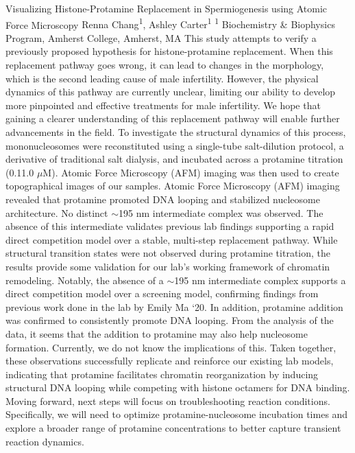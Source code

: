 \makeabstract
    {
    Visualizing Histone-Protamine Replacement in Spermiogenesis using Atomic Force Microscopy
    }
    {
    Renna Chang\textsuperscript{1}, Ashley Carter\textsuperscript{1}
    }
    {
    \textsuperscript{1} Biochemistry \& Biophysics Program, Amherst College, Amherst, MA
    }
    {
    This study attempts to verify a previously proposed hypothesis for histone-protamine replacement. When this replacement pathway goes wrong, it can lead to changes in the morphology, which is the second leading cause of male infertility. However, the physical dynamics of this pathway are currently unclear, limiting our ability to develop more pinpointed and effective treatments for male infertility. We hope that gaining a clearer understanding of this replacement pathway will enable further advancements in the field.
    }
    {
    To investigate the structural dynamics of this process, mononucleosomes were reconstituted using a single-tube salt-dilution protocol, a derivative of traditional salt dialysis, and incubated across a protamine titration (0.1{\textendash}1.0 \ensuremath{\mu}M). Atomic Force Microscopy (AFM) imaging was then used to create topographical images of our samples.
    }
    {
    Atomic Force Microscopy (AFM) imaging revealed that protamine promoted DNA looping and stabilized nucleosome architecture. No distinct $\sim$195 nm intermediate complex was observed. The absence of this intermediate validates previous lab findings supporting a rapid direct competition model over a stable, multi-step replacement pathway.
    }
    {
    While structural transition states were not observed during protamine titration, the results provide some validation for our lab{\textquoteright}s working framework of chromatin remodeling. Notably, the absence of a $\sim$195 nm intermediate complex supports a direct competition model over a screening model, confirming findings from previous work done in the lab by Emily Ma {\textquoteleft}20. In addition, protamine addition was confirmed to consistently promote DNA looping. From the analysis of the data, it seems that the addition to protamine may also help nucleosome formation. Currently, we do not know the implications of this. Taken together, these observations successfully replicate and reinforce our existing lab models, indicating that protamine facilitates chromatin reorganization by inducing structural DNA looping while competing with histone octamers for DNA binding. Moving forward, next steps will focus on troubleshooting reaction conditions. Specifically, we will need to optimize protamine-nucleosome incubation times and explore a broader range of protamine concentrations to better capture transient reaction dynamics.
    }

    \newpage
    
